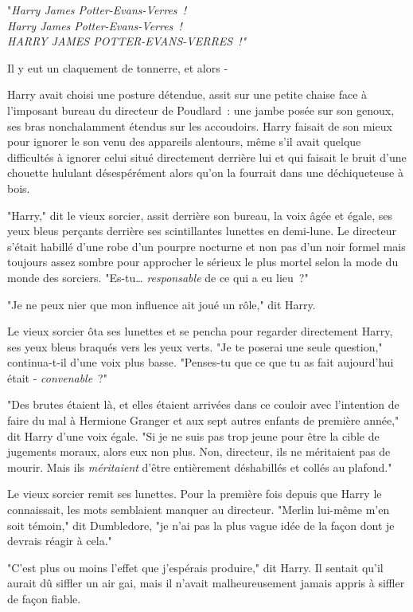 "\emph{Harry James Potter-Evans-Verres~!\\
Harry James Potter-Evans-Verres~!\\
HARRY JAMES POTTER-EVANS-VERRES~!"}

Il y eut un claquement de tonnerre, et alors -

\later

Harry avait choisi une posture détendue, assit sur une petite chaise face à l'imposant bureau du directeur de Poudlard~: une jambe posée sur son genoux, ses bras nonchalamment étendus sur les accoudoirs. Harry faisait de son mieux pour ignorer le son venu des appareils alentours, même s'il avait quelque difficultés à ignorer celui situé directement derrière lui et qui faisait le bruit d'une chouette hululant désespérément alors qu'on la fourrait dans une déchiqueteuse à bois.

"Harry," dit le vieux sorcier, assit derrière son bureau, la voix âgée et égale, ses yeux bleus perçants derrière ses scintillantes lunettes en demi-lune. Le directeur s'était habillé d'une robe d'un pourpre nocturne et non pas d'un noir formel mais toujours assez sombre pour approcher le sérieux le plus mortel selon la mode du monde des sorciers. "Es-tu… \emph{responsable} de ce qui a eu lieu~?"

"Je ne peux nier que mon influence ait joué un rôle," dit Harry.

Le vieux sorcier ôta ses lunettes et se pencha pour regarder directement Harry, ses yeux bleus braqués vers les yeux verts. "Je te poserai une seule question," continua-t-il d'une voix plus basse. "Penses-tu que ce que tu as fait aujourd'hui était - \emph{convenable}~?"

"Des brutes étaient là, et elles étaient arrivées dans ce couloir avec l'intention de faire du mal à Hermione Granger et aux sept autres enfants de première année," dit Harry d'une voix égale. "Si je ne suis pas trop jeune pour être la cible de jugements moraux, alors eux non plus. Non, directeur, ils ne méritaient pas de mourir. Mais ils \emph{méritaient} d'être entièrement déshabillés et collés au plafond."

Le vieux sorcier remit ses lunettes. Pour la première fois depuis que Harry le connaissait, les mots semblaient manquer au directeur. "Merlin lui-même m'en soit témoin," dit Dumbledore, "je n'ai pas la plus vague idée de la façon dont je devrais réagir à cela."

"C'est plus ou moins l'effet que j'espérais produire," dit Harry. Il sentait qu'il aurait dû siffler un air gai, mais il n'avait malheureusement jamais appris à siffler de façon fiable.


